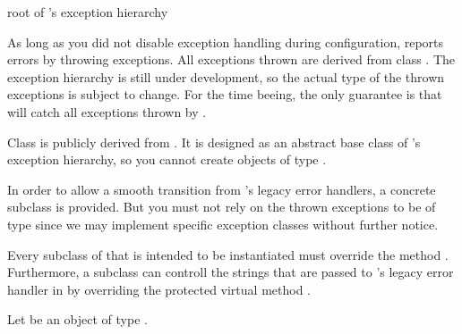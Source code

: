 


\NAME

 \dotfill root of \LiDIA's exception hierarchy



\ABSTRACT

As long as you did not disable exception handling during configuration, \LiDIA
reports errors by throwing exceptions. All exceptions thrown are derived from
class . The exception hierarchy is still under development,
so the actual type of the thrown exceptions is subject to change. For the time
beeing, the only guarantee is that
 will catch all exceptions
thrown by \LiDIA.


\DESCRIPTION

Class  is publicly derived from . It
is designed as an abstract base class of \LiDIA's exception hierarchy, so you
cannot create objects of type . 

In order to allow a smooth transition from \LiDIA's legacy error handlers, a
concrete subclass  is provided. But you must not rely on
the thrown exceptions to be of type  since we may implement
specific exception classes without further notice.

\begin{techdoc}
  Every subclass of  that is intended to be instantiated must
  override the method . Furthermore, a subclass can
  controll the strings that are passed to \LiDIA's legacy error handler in
   by overriding the protected virtual method
  .
\end{techdoc}

Let  be an object of type .


